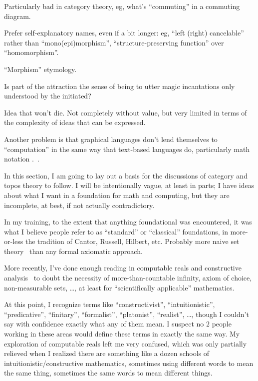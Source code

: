 \documentclass[11pt,openany]{article}
\begin{document}
Particularly bad in category theory, eg, 
what's ``commuting'' in a commuting diagram.

Prefer self-explanatory names, even if a bit longer:
eg, ``left (right) cancelable'' rather than ``mono(epi)morphism'',
``structure-preserving function'' over ``homomorphism''.

``Morphism'' etymology.

Is part of the attraction the sense of being to utter magic 
incantations only understood by the initiated?

 
\label{sec:Graphical-languages}

Idea that won't die. 
Not completely without value, 
but very limited in terms of the complexity of ideas that can be
expressed.

Another problem is that graphical languages don't lend themselves
to ``computation''
in the same way that text-based languages do,
particularly math notation .~\cite{dutilh_novaes_2012}.

\setcounter{currentlevel}{\value{baseSectionLevel}}
\label{sec:Foundational-Sketch}

In this section, I am going to lay out a basis for
the discussions of category and topos theory to follow. 
I will be intentionally vague, at least in parts;
I have ideas about what I want in a foundation 
for math and computing, but they are incomplete, at best,
if not actually contradictory.

In my training, to the extent that anything 
foundational was encountered,
it was what I believe people refer to as ``standard'' or
``classical'' foundations,
in more-or-less the tradition of Cantor, Russell, Hilbert, etc.
Probably more naive set theory~\cite{Halmos1960Naive} 
than any formal axiomatic approach.

More recently, I've done enough reading in 
computable reals and constructive 
analysis~\cite{henle:2012:numbers,Bridger:2019}
to doubt the necessity of more-than-countable infinity,
axiom of choice, non-measurable sets, {\ldots},
at least for ``scientifically applicable'' 
mathematics.~\cite{feferman1989CantorNecessary,
feferman1992LongWay}

At this point, I recognize terms like
``constructivist'', ``intuitionistic'', ``predicative'', 
``finitary'', ``formalist'', ``platonist'', ``realist'', {\ldots},
though I couldn't say with confidence exactly what any of them
mean. 
I suspect no $2$ people working in these areas would define these
terms in exactly the same way.
My exploration of computable reals left me very confused,
which was only partially relieved when I realized there are 
something like a dozen schools of intuitionistic/constructive
mathematics, sometimes using different words to mean the
same thing, sometimes the same words to mean different things.
\end{document}
